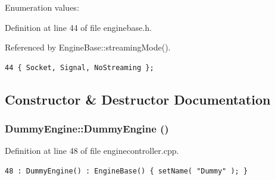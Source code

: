 \begin{Desc}
\item[Enumeration values: ]\par
\begin{description}
\item[{\em 
Socket\label{classEngineBase_EngineBasew8EngineBasew4}
}]\item[{\em 
Signal\label{classEngineBase_EngineBasew8EngineBasew5}
}]\item[{\em 
No\-Streaming\label{classEngineBase_EngineBasew8EngineBasew6}
}]\end{description}
\end{Desc}



Definition at line 44 of file enginebase.h.

Referenced by Engine\-Base::streaming\-Mode().



\footnotesize\begin{verbatim}44 { Socket, Signal, NoStreaming };
\end{verbatim}\normalsize 


\subsection{Constructor \& Destructor Documentation}
\subsubsection{\setlength{\rightskip}{0pt plus 5cm}Dummy\-Engine::Dummy\-Engine ()\hspace{0.3cm}{\tt  [inline]}}\label{classDummyEngine_DummyEnginea0}




Definition at line 48 of file enginecontroller.cpp.



\footnotesize\begin{verbatim}48 : DummyEngine() : EngineBase() { setName( "Dummy" ); }
\end{verbatim}\normalsize 


